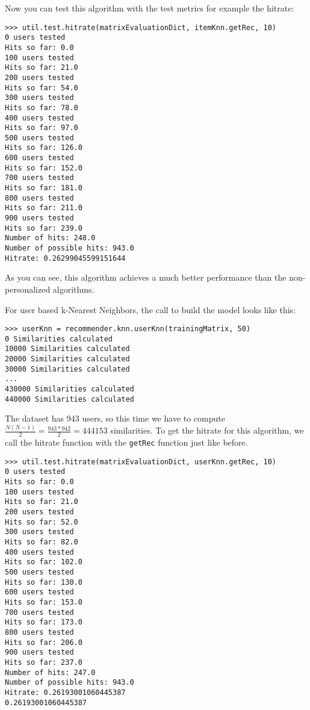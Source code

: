 Now you can test this algorithm with the test metrics for example the hitrate:
\begin{lstlisting}[style=python]
>>> util.test.hitrate(matrixEvaluationDict, itemKnn.getRec, 10)
0 users tested
Hits so far: 0.0
100 users tested
Hits so far: 21.0
200 users tested
Hits so far: 54.0
300 users tested
Hits so far: 78.0
400 users tested
Hits so far: 97.0
500 users tested
Hits so far: 126.0
600 users tested
Hits so far: 152.0
700 users tested
Hits so far: 181.0
800 users tested
Hits so far: 211.0
900 users tested
Hits so far: 239.0
Number of hits: 248.0
Number of possible hits: 943.0
Hitrate: 0.26299045599151644
\end{lstlisting}
As you can see, this algorithm achieves a much better performance than the
non-personalized algorithms.

For user based k-Nearest Neighbors, the call to build the model looks like this:
\begin{lstlisting}[style=python]
>>> userKnn = recommender.knn.userKnn(trainingMatrix, 50)
0 Similarities calculated
10000 Similarities calculated
20000 Similarities calculated
30000 Similarities calculated
...
430000 Similarities calculated
440000 Similarities calculated
\end{lstlisting}
The dataset has 943 users, so this time we have to compute 
\begin{math} \frac{N(N-1)}{2}=\frac{943*942}{2} = 444153 \end{math} similarities.
To get the hitrate for this algorithm, we call the hitrate
function with the \lstinline!getRec! function just like before.
\begin{lstlisting}[style=python]
>>> util.test.hitrate(matrixEvaluationDict, userKnn.getRec, 10)
0 users tested
Hits so far: 0.0
100 users tested
Hits so far: 21.0
200 users tested
Hits so far: 52.0
300 users tested
Hits so far: 82.0
400 users tested
Hits so far: 102.0
500 users tested
Hits so far: 130.0
600 users tested
Hits so far: 153.0
700 users tested
Hits so far: 173.0
800 users tested
Hits so far: 206.0
900 users tested
Hits so far: 237.0
Number of hits: 247.0
Number of possible hits: 943.0
Hitrate: 0.26193001060445387
0.26193001060445387
\end{lstlisting}

